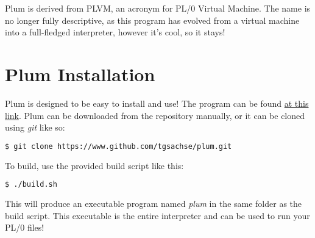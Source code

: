 \documentclass{article}
\begin{document}
Plum is derived from PLVM, an acronym for PL/0 Virtual Machine.
The name is no longer fully descriptive, as this program has evolved from a virtual machine into a
full-fledged interpreter, however it's cool, so it stays!

\section*{Plum Installation}
Plum is designed to be easy to install and use! The program can be found 
\href{https://www.github.com/tgsachse/plum}{at this link}. Plum can be downloaded from
the repository manually, or it can be cloned using \emph{git} like so:
\begin{lstlisting}[language=bash]
$ git clone https://www.github.com/tgsachse/plum.git
\end{lstlisting}
To build, use the provided build script like this:
\begin{lstlisting}[language=bash]
$ ./build.sh
\end{lstlisting}
This will produce an executable program named \emph{plum} in the same folder as
the build script. This executable is the entire interpreter and can be used to run
your PL/0 files!
\end{document}

